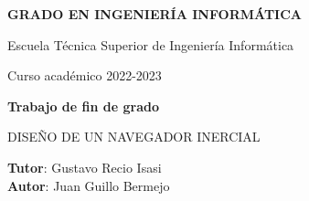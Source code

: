\thispagestyle{empty}
\vspace{2cm}

\begin{figure}[htb]
  \centerline{}
\end{figure}

\begin{center}
  {\Large {\bf GRADO EN INGENIERÍA INFORMÁTICA}}
  \vspace{5mm}
 
  {\large {Escuela Técnica Superior de Ingeniería Informática}}
  \vspace{5mm}

  {\large {Curso académico 2022-2023}}

  \vspace{1cm}

  {\large {\bf Trabajo de fin de grado}}

  \vspace{2cm}

  {\Large {DISEÑO DE UN NAVEGADOR INERCIAL\\[1cm] }}

  \vspace{5cm}
  {\bf Tutor}: Gustavo Recio Isasi \\
  {\bf Autor}: Juan Guillo Bermejo
\end{center}

\clearpage
\thispagestyle{empty}
